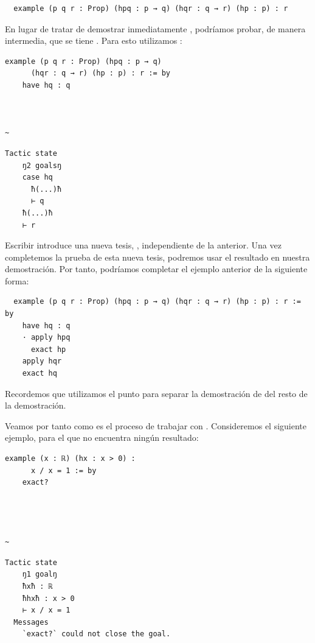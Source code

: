\begin{lstlisting}
  example (p q r : Prop) (hpq : p → q) (hqr : q → r) (hp : p) : r
\end{lstlisting}

En lugar de tratar de demostrar inmediatamente , podríamos probar, de manera intermedia, que se tiene . Para esto utilizamos :

\begin{minipage}[t]{0.58\textwidth}
\begin{lstlisting}[language=lean]
  example (p q r : Prop) (hpq : p → q)
      (hqr : q → r) (hp : p) : r := by
    have hq : q



~
\end{lstlisting}
\end{minipage}%
\hfill
\begin{minipage}[t]{0.40\textwidth}
\begin{lstlisting}[language=infoview]
  Tactic state
    ŋ2 goalsŋ
    case hq
      ħ(...)ħ
      ⊢ q
    ħ(...)ħ
    ⊢ r
\end{lstlisting}
\end{minipage}

Escribir  introduce una nueva tesis, , independiente de la anterior. Una vez completemos la prueba de esta nueva tesis, podremos usar el resultado en nuestra demostración. Por tanto, podríamos completar el ejemplo anterior de la siguiente forma:

\begin{lstlisting}
  example (p q r : Prop) (hpq : p → q) (hqr : q → r) (hp : p) : r := by
    have hq : q
    · apply hpq
      exact hp
    apply hqr
    exact hq
\end{lstlisting}

Recordemos que utilizamos el punto  para separar la demostración de  del resto de la demostración.

Veamos por tanto como es el proceso de trabajar con . Consideremos el siguiente ejemplo, para el que  no encuentra ningún resultado:


\begin{minipage}[t]{0.58\textwidth}
\begin{lstlisting}[language=lean]
  example (x : ℝ) (hx : x > 0) :
      x / x = 1 := by
    exact?




~
\end{lstlisting}
\end{minipage}%
\hfill
\begin{minipage}[t]{0.40\textwidth}
\begin{lstlisting}[language=infoview]
  Tactic state
    ŋ1 goalŋ
    ħxħ : ℝ
    ħhxħ : x > 0
    ⊢ x / x = 1
  Messages
    `exact?` could not close the goal.
\end{lstlisting}
\end{minipage}

